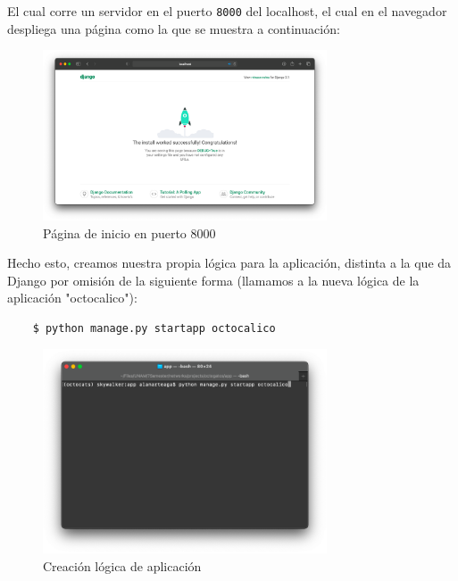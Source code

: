 \documentclass{article}
\begin{document}
\begin{enumerate}
    El cual corre un servidor en el puerto \texttt{8000} del localhost, el cual
    en el navegador despliega una página como la que se muestra a continuación:
    \begin{figure}[H]
      \centering
      \includegraphics[width=0.75\textwidth]{AppServer/f4}
      \caption{Página de inicio en puerto 8000}
    \end{figure}

    Hecho esto, creamos nuestra propia lógica para la aplicación, distinta a la
    que da Django por omisión de la siguiente forma (llamamos a la nueva lógica
    de la aplicación "octocalico"):
    \begin{lstlisting}
    $ python manage.py startapp octocalico
    \end{lstlisting}
    \begin{figure}[H]
      \centering
      \includegraphics[width=0.75\textwidth]{AppServer/f5}
      \caption{Creación lógica de aplicación}
    \end{figure}


\end{enumerate}
\end{document}
